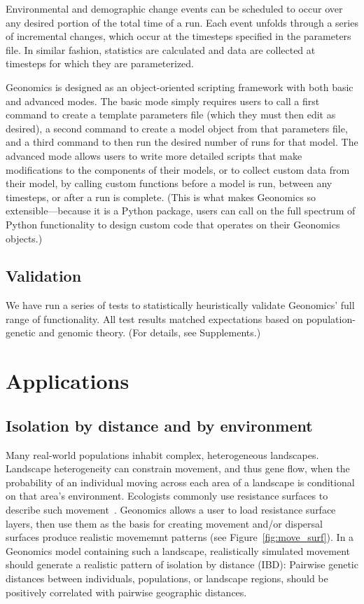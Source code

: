 ﻿\documentclass{article}
\begin{document}
Environmental and demographic change events can be scheduled to occur over
any desired portion of the total time of a run.
Each event unfolds through a series of incremental changes, which occur at the
timesteps specified in the parameters file.
In similar fashion, statistics are calculated and data are collected
at timesteps for which they are parameterized. 

Geonomics is designed as an object-oriented scripting framework with both basic and advanced modes.
The basic mode simply requires users to call a first command to create a template
parameters file (which they must then edit as desired), a second command to create
a model object from that parameters file, and a third command
to then run the desired number of runs for that model.
The advanced mode allows users to write more detailed scripts that make modifications
to the components of their models, or to collect custom data from their model,
by calling custom functions before a model is run, between any timesteps,
or after a run is complete.
(This is what makes Geonomics so extensible---because it is a Python package,
users can call on the full spectrum of Python functionality to design custom code
that operates on their Geonomics objects.)

\subsection{Validation}
We have run a series of tests to statistically heuristically validate
Geonomics' full range of functionality.
All test results matched expectations based on
population-genetic and genomic theory.
(For details, see Supplements.)

\section{Applications}

\subsection{Isolation by distance and by environment}
Many real-world populations inhabit complex, heterogeneous landscapes.
Landscape heterogeneity can constrain movement, and thus gene flow, when
the probability of an individual moving across each area of a landscape
is conditional on that area's environment.
Ecologists commonly use resistance surfaces to describe such movement~\cite{mcrae}.
Geonomics allows a user to load resistance surface layers, then use them as the basis
for creating movement and/or dispersal surfaces produce realistic movememnt patterns
(see Figure~\ref{fig:move_surf}).
In a Geonomics model containing such a landscape, realistically simulated movement 
should generate a realistic pattern of isolation by distance (IBD): 
Pairwise genetic distances between individuals, populations, or landscape regions, 
should be positively correlated with pairwise geographic distances.
\end{document}

